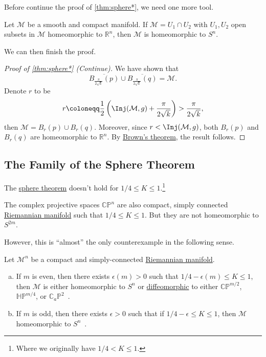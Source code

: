 Before continue the proof of \autoref{thm:sphere*}, we need one more tool.

\begin{theorem}\label{thm:Brown}
	Let \(\mathcal{M} \) be a smooth and compact manifold. If \(\mathcal{M} = U_1 \cap U_2\) with \(U_1, U_2\) open subsets in \(\mathcal{M} \) homeomorphic to \(\mathbb{R} ^n\), then \(\mathcal{M} \) is homeomorphic to \(S^n\).
\end{theorem}

We can then finish the proof.

\begin{proof}[Proof of \autoref{thm:sphere*} (Continue)]
	We have shown that
	\[
		\overline{B_{\frac{\pi}{2\sqrt{k} }}(p)} \cup \overline{B_{\frac{\pi}{2 \sqrt{k} }}(q)} = \mathcal{M}.
	\]
	Denote \(r\) to be
	\[
		r \coloneqq \frac{1}{2} \left( \Inj(\mathcal{M} , g) + \frac{\pi}{2 \sqrt{k} } \right) > \frac{\pi}{2 \sqrt{k}} ,
	\]
	then \(\mathcal{M} = B_r(p) \cup B_r(q)\). Moreover, since \(r < \Inj(\mathcal{M} , g) \), both \(B_r(p)\) and \(B_r(q)\) are homeomorphic to \(\mathbb{R} ^n\). By \hyperref[thm:Brown]{Brown's theorem}, the result follows.
\end{proof}

\subsection{The Family of the Sphere Theorem}
The \hyperref[thm:sphere*]{sphere theorem} doesn't hold for \(1 / 4 \leq K \leq 1\).\footnote{Where we originally have \(1 / 4 < K \leq 1\).}

\begin{eg}
	The complex projective spaces \(\mathbb{C} \mathbb{P} ^n\) are also compact, simply connected \hyperref[def:Riemannian-manifold]{Riemannian manifold} such that \(1 / 4 \leq K \leq 1\). But they are not homeomorphic to \(S^{2m} \).
\end{eg}

However, this is ``almost'' the only counterexample in the following sense.

\begin{theorem}
	Let \(\mathcal{M} ^n\) be a compact and simply-connected \hyperref[def:Riemannian-manifold]{Riemannian manifold}.
	\begin{enumerate}[(a)]
		\item If \(m\) is even, then there exists \(\epsilon (m) > 0\) such that \(1 / 4 - \epsilon (m) \leq K \leq 1\), then \(\mathcal{M} \) is either homeomorphic to \(S^n\) or \hyperref[def:diffeomorphic]{diffeomorphic} to either \(\mathbb{C} \mathbb{P} ^{m / 2}\), \(\mathbb{H} \mathbb{P} ^{m / 4}\), or \(\mathbb{C} _a \mathbb{P} ^2\)~\cite{AIF_1983__33_2_135_0}.
		\item If \(m\) is odd, then there exists \(\epsilon > 0\) such that if \(1 / 4 - \epsilon \leq K \leq 1\), then \(\mathcal{M} \) homeomorphic to \(S^n\)~\cite{Abresch1996AST}.
	\end{enumerate}
\end{theorem}

